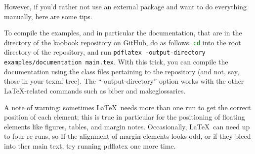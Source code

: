 However, if you'd rather not use an external package and want to do 
everything manually, here are some tips.

To compile the examples, and in particular the documentation, that are 
in the  directory of the 
\href{https://github.com/fmarotta/kaobook}{kaobook repository} on 
GitHub, do as follows. \lstinline[language=bash]|cd| into the root 
directory of the repository, and run
\lstinline|pdflatex -output-directory examples/documentation main.tex|. 
With this trick, you can compile the documentation using the class files 
pertaining to the repository (and not, say, those in your texmf tree). 
The \enquote{-output-directory} option works with the other 
\LaTeX-related commands such as biber and makeglossaries.

A note of warning: sometimes \LaTeX\ needs more than one run to get the
correct position of each element; this is true in particular for the
positioning of floating elements like figures, tables, and margin notes.
Occasionally, \LaTeX\ can need up to four re-runs, so If the alignment
of margin elements looks odd, or if they bleed into ther main text, try
running pdflatex one more time.
